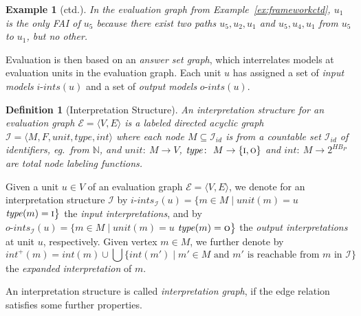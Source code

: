 \documentclass[11pt,fleqn,twoside]{article}
\newcommand{\Program}{\ensuremath{P}}
\newtheorem{definition}{Definition}
\newtheorem{example}{Example}
\begin{document}
{			\begin{example}[ctd.]
				\label{ex:fai}
				In the evaluation graph from Example~\ref{ex:frameworkctd}, $u_1$ is the only FAI of $u_5$ because there
				exist two paths $u_5, u_2, u_1$ and $u_5, u_4, u_1$ from $u_5$ to $u_1$, but no other.
			\end{example}
			
			Evaluation is then based on an \emph{answer set graph}, which interrelates models at evaluation units in the
			evaluation graph.
			Each unit $u$ has assigned a set of \emph{input models} $\mathit{i\mbox{-}ints}(u)$ and
			a set of \emph{output models} $\mathit{o\mbox{-}ints}(u)$.

			\begin{definition}[Interpretation Structure]
				\label{def:interpretationstructure}
				An \emph{interpretation structure}
				for an evaluation graph $\mathcal{E} = \langle V, E \rangle$
				is a labeled directed acyclic graph
				$\mathcal{I} = \langle M, F, \mathit{unit}, \mathit{type}, \mathit{int} \rangle$
				where each node $M \subseteq \mathcal{I}_{\mathit{id}}$ is
				from a countable set $\mathcal{I}_{\mathit{id}}$ of identifiers, eg.~from $\mathbb{N}$,
				and $\mathit{unit}\colon\ M \rightarrow V$, $\mathit{type}\colon\ M \rightarrow \{ \textsc{i}, \textsc{o} \}$
				and $\mathit{int}\colon\ M \rightarrow 2^{\mathit{HB}_{\Program}}$ are total node labeling functions.
			\end{definition}
			
			Given a unit $u \in V$ of an evaluation graph $\mathcal{E} = \langle V, E \rangle$,
			we denote for an interpretation structure $\mathcal{I}$ by
			$\mathit{i\mbox{-}ints}_{\mathcal{I}}(u) = \big\{ m \in M \mid \mathit{unit}(m) = u$  $\mathit{type}(m)=\textsc{i} \big\}$
			the \emph{input interpretations},
			and by 
			$\mathit{o\mbox{-}ints}_{\mathcal{I}}(u) = \big\{ m \in M \mid \mathit{unit}(m) = u$  $\mathit{type}(m)=\textsc{o} \big\}$
			the \emph{output interpretations} at unit $u$, respectively.
			Given vertex $m \in M$, we further denote by
			$$\mathit{int}^{+}(m) = \mathit{int}(m) \cup \bigcup \big\{ \mathit{int}(m') \mid m' \in M \text{ and } m' \text{ is reachable from } m \text{ in } \mathcal{I} \big\}$$
			the \emph{expanded interpretation} of $m$.
			
			An interpretation structure is called \emph{interpretation graph}, if the edge relation satisfies
			some further properties.
			
}
\end{document}
